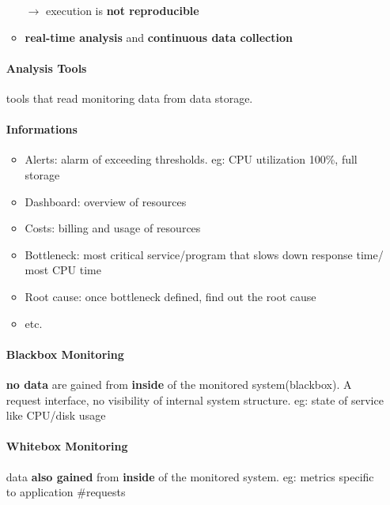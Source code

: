 \begin{itemize}
\begin{itemize}
		$\rightarrow$ execution is \textbf{not reproducible}
		\item \textbf{real-time analysis} and \textbf{continuous data collection}
	\end{itemize}
	
	\paragraph{Analysis Tools} tools that read monitoring data from data storage.
	\paragraph{Informations}
	\begin{itemize}
		\item Alerts: alarm of exceeding thresholds. eg: CPU utilization 100\%, full storage
		\item Dashboard: overview of resources
		\item Costs: billing and usage of resources
		\item Bottleneck: most critical service/program that slows down response time/ most CPU time
		\item Root cause: once bottleneck defined, find out the root cause
		\item etc.
	\end{itemize}

	\paragraph{Blackbox Monitoring} \textbf{no data} are gained from \textbf{inside} of the monitored system(blackbox). A request interface, no visibility of internal system structure. eg: state of service like CPU/disk usage
	
	\paragraph{Whitebox Monitoring} data \textbf{also gained} from \textbf{inside} of the monitored system. eg: metrics specific to application \#requests
\end{itemize}

